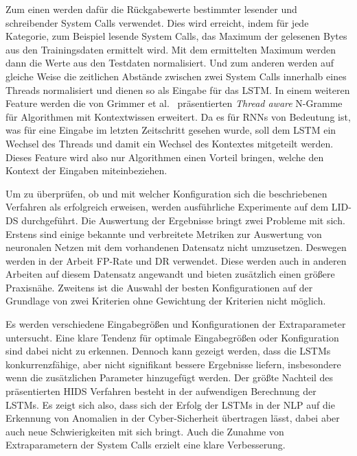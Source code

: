Zum einen werden dafür die Rückgabewerte bestimmter lesender und schreibender System Calls verwendet. 
Dies wird erreicht, indem für jede Kategorie, zum Beispiel lesende System Calls, das Maximum der gelesenen Bytes aus den Trainingsdaten ermittelt wird.
Mit dem ermittelten Maximum werden dann die Werte aus den Testdaten normalisiert.
Und zum anderen werden auf gleiche Weise die zeitlichen Abstände zwischen zwei System Calls innerhalb eines Threads normalisiert und dienen so als Eingabe für das \ac{LSTM}.
In einem weiteren Feature werden die von Grimmer et al.~\cite{IDSTHREADGRIMMER2021} präsentierten \textit{Thread aware} N-Gramme für Algorithmen mit Kontextwissen erweitert.
Da es für \acp{RNN} von Bedeutung ist, was für eine Eingabe im letzten Zeitschritt gesehen wurde, soll dem \ac{LSTM} ein Wechsel des Threads und damit ein Wechsel des Kontextes mitgeteilt werden.
Dieses Feature wird also nur Algorithmen einen Vorteil bringen, welche den Kontext der Eingaben miteinbeziehen.\par\medskip
Um zu überprüfen, ob und mit welcher Konfiguration sich die beschriebenen Verfahren als erfolgreich erweisen, werden ausführliche Experimente auf dem \ac{LID-DS} durchgeführt.
Die Auswertung der Ergebnisse bringt zwei Probleme mit sich.
Erstens sind einige bekannte und verbreitete Metriken zur Auswertung von neuronalen Netzen mit dem vorhandenen Datensatz nicht umzusetzen.
Deswegen werden in der Arbeit \ac{FP}-Rate und \ac{DR} verwendet. 
Diese werden auch in anderen Arbeiten auf diesem Datensatz angewandt und bieten zusätzlich einen größere Praxisnähe.
Zweitens ist die Auswahl der besten Konfigurationen auf der Grundlage von zwei Kriterien ohne Gewichtung der Kriterien nicht möglich.\par\medskip
Es werden verschiedene Eingabegrößen und Konfigurationen der Extraparameter untersucht.
Eine klare Tendenz für optimale Eingabegrößen oder Konfiguration sind dabei nicht zu erkennen.
Dennoch kann gezeigt werden, dass die \acp{LSTM} konkurrenzfähige, aber nicht signifikant bessere Ergebnisse liefern, insbesondere wenn die zusätzlichen Parameter hinzugefügt werden.
Der größte Nachteil des präsentierten \ac{HIDS} Verfahren besteht in der aufwendigen Berechnung der \acp{LSTM}.
Es zeigt sich also, dass sich der Erfolg der \acp{LSTM} in der \ac{NLP} auf die Erkennung von Anomalien in der Cyber-Sicherheit übertragen lässt, dabei aber auch neue Schwierigkeiten mit sich bringt.
Auch die Zunahme von Extraparametern der System Calls erzielt eine klare Verbesserung.

